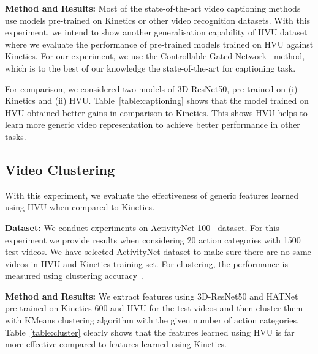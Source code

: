 \documentclass[runningheads]{llncs}
\begin{document}
\noindent\textbf{Method and Results:} Most of the state-of-the-art video captioning methods use models pre-trained on Kinetics or other video recognition datasets. With this experiment, we intend to show another generalisation capability of HVU dataset where we evaluate the performance of pre-trained models trained on HVU against Kinetics. For our experiment, we use the Controllable Gated Network~\cite{xgate} method, which is to the best of our knowledge the state-of-the-art for captioning task. 

For comparison, we considered two models of 3D-ResNet50, pre-trained on (i) Kinetics and (ii) HVU. Table~\ref{table:captioning} shows that the model trained on HVU obtained better gains in comparison to Kinetics. This shows HVU helps to learn more generic video representation to achieve better performance in other tasks.
\vspace{-0.2cm}











\subsection{Video Clustering}
With this experiment, we evaluate the effectiveness of generic features learned using HVU when compared to Kinetics.  

\noindent\textbf{Dataset:} We conduct experiments on ActivityNet-100~\cite{actnet} dataset. For this experiment  we provide results when considering 20 action categories with 1500 test videos. We have selected ActivityNet dataset to make sure there are no same videos in HVU and Kinetics training set. For clustering, the performance is measured using clustering accuracy~\cite{sharmafg}. 


\noindent\textbf{Method and Results:} We extract features using 3D-ResNet50 and HATNet pre-trained on Kinetics-600 and HVU for the test videos and then cluster them with KMeans clustering algorithm with the given number of action categories. Table~\ref{table:cluster} clearly shows that the features learned using HVU is far more effective compared to features learned using Kinetics.
\vspace{-0.2cm}
\end{document}
